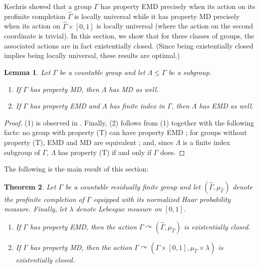 \documentclass[12pt]{amsart}
\newtheorem{thm}{Theorem}[section]
\newtheorem{lem}[thm]{Lemma}
\theoremstyle{definition}
\newcommand{\acts}{\curvearrowright}
\begin{document}
Kechris \cite[Propositions 4.2, 4.5, and 4.8]{kechrisweak} showed that a group $\Gamma$ has property EMD precisely when its action on its profinite completion $\hat\Gamma$ is locally universal while it has property MD precisely when its action on $\hat \Gamma\times [0,1]$ is locally universal (where the action on the second coordinate is trivial).  In this section, we show that for these classes of groups, the associated actions are in fact existentially closed.  (Since being existentially closed implies being locally universal, these results are optimal.)

\begin{lem} \label{lem:MDsubgroup}
	Let $\Gamma$ be a countable group and let $\Lambda \leq \Gamma$ be a subgroup.
	\begin{enumerate}
		\item If $\Gamma$ has property MD, then $\Lambda$ has MD as well.
		\item If $\Gamma$ has property EMD and $\Lambda$ has finite index in $\Gamma$, then $\Lambda$ has EMD as well.
	\end{enumerate}
\end{lem}

\begin{proof}
	(1) is observed in \cite[Section 4]{kechrisweak}. Finally, (2) follows from (1) together with the following facts: no group with property (T) can have property EMD \cite[Proposition 6]{kechrisweak}; for groups without property (T), EMD and MD are equivalent \cite[Corollary 4.7]{TD}; and, since $\Lambda$ is a finite index subgroup of $\Gamma$, $\Lambda$ has property (T) if and only if $\Gamma$ does.
\end{proof}

The following is the main result of this section:
	
\begin{thm}\label{thm:MD_EMD_ec_profinite}
	Let $\Gamma$ be a countable residually finite group and let $(\hat{\Gamma}, \mu_{\hat{\Gamma}})$ denote the profinite completion of $\Gamma$ equipped with its normalized Haar probability measure. Finally, let $\lambda$ denote Lebesgue measure on $[0,1]$.
	\begin{enumerate}
		\item If $\Gamma$ has property EMD, then the action $\Gamma \acts (\hat{\Gamma}, \mu_{\hat{\Gamma}})$ is existentially closed.
		\item If $\Gamma$ has property MD, then the action $\Gamma \acts (\hat{\Gamma} \times [0, 1], \mu_{\hat{\Gamma}} \times \lambda)$ is existentially closed.
	\end{enumerate}
\end{thm}
\end{document}
